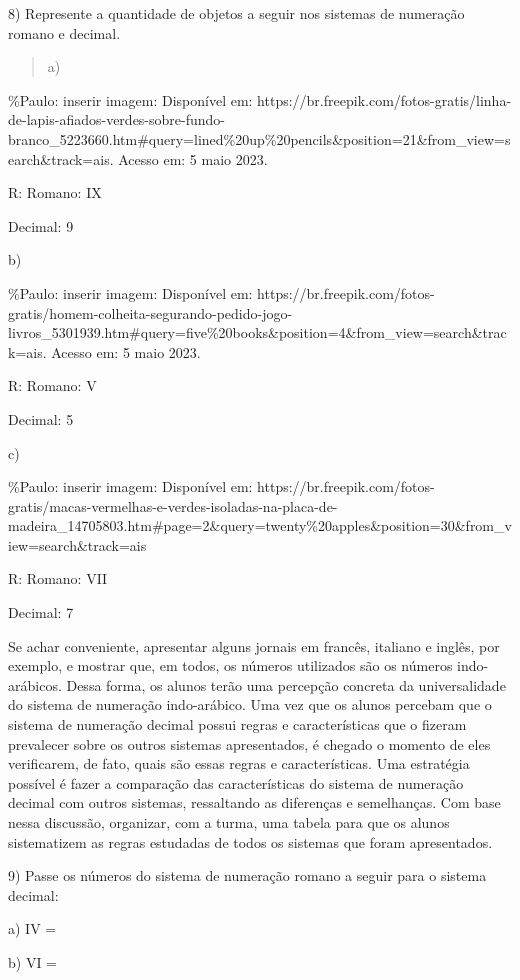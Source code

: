 8) Represente a quantidade de objetos a seguir nos sistemas de numeração
romano e decimal.

\begin{quote}
a)
\end{quote}

\%Paulo: inserir imagem: Disponível em:
https://br.freepik.com/fotos-gratis/linha-de-lapis-afiados-verdes-sobre-fundo-branco\_5223660.htm\#query=lined\%20up\%20pencils\&position=21\&from\_view=search\&track=ais.
Acesso em: 5 maio 2023.

R: Romano: IX

Decimal: 9

b)

\%Paulo: inserir imagem: Disponível em:
https://br.freepik.com/fotos-gratis/homem-colheita-segurando-pedido-jogo-livros\_5301939.htm\#query=five\%20books\&position=4\&from\_view=search\&track=ais.
Acesso em: 5 maio 2023.

R: Romano: V

Decimal: 5

c)

\%Paulo: inserir imagem: Disponível em:
https://br.freepik.com/fotos-gratis/macas-vermelhas-e-verdes-isoladas-na-placa-de-madeira\_14705803.htm\#page=2\&query=twenty\%20apples\&position=30\&from\_view=search\&track=ais

R: Romano: VII

Decimal: 7

Se achar conveniente, apresentar alguns jornais em francês, italiano e
inglês, por exemplo, e mostrar que, em todos, os números utilizados são
os números indo-arábicos. Dessa forma, os alunos terão uma percepção
concreta da universalidade do sistema de numeração indo-arábico. Uma vez
que os alunos percebam que o sistema de numeração decimal possui regras
e características que o fizeram prevalecer sobre os outros sistemas
apresentados, é chegado o momento de eles verificarem, de fato, quais
são essas regras e características. Uma estratégia possível é fazer a
comparação das características do sistema de numeração decimal com
outros sistemas, ressaltando as diferenças e semelhanças. Com base nessa
discussão, organizar, com a turma, uma tabela para que os alunos
sistematizem as regras estudadas de todos os sistemas que foram
apresentados.

9) Passe os números do sistema de numeração romano a seguir para o
sistema decimal:

a) IV =

b) VI =

